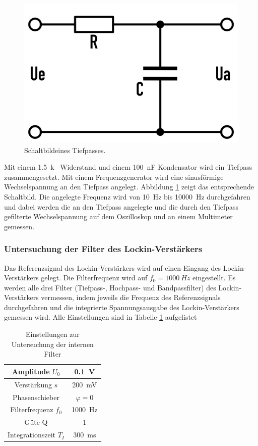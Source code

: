 \documentclass[12pt,a4paper]{article}
\begin{document}
\begin{figure}[H]
\centering
\includegraphics[scale=0.1]{Bilder/Vorversuch1/Tiefpass_Schaltbild.png}
\caption[test]{Schaltbild\footnotemark eines Tiefpasses.}
\label{fig:Tiefpass_Schaltbild}
\end{figure}

Mit einem \SI{1,5}{k \Omega} Widerstand und einem \SI{100}{nF} Kondensator wird ein Tiefpass zusammengesetzt. Mit einem Frequenzgenerator wird eine sinusförmige Wechselspannung an den Tiefpass angelegt. Abbildung \ref{fig:Tiefpass_Schaltbild} zeigt das entsprechende Schaltbild. Die angelegte Frequenz wird von \SI{10}{Hz} bis \SI{10000}{Hz} durchgefahren und dabei werden die an den Tiefpass angelegte und die durch den Tiefpass gefilterte Wechselspannung auf dem Oszilloskop und an einem Multimeter gemessen.

\subsubsection{Untersuchung der Filter des Lockin-Verstärkers}
Das Referenzsignal des Lockin-Verstärkers wird auf einen Eingang des Lockin-Verstärkers gelegt. Die Filterfrequenz wird auf $f_0 = \SI{1000}{Hz}$ eingestellt. Es werden alle drei Filter (Tiefpass-, Hochpass- und Bandpassfilter) des Lockin-Verstärkers vermessen, indem jeweils die Frequenz des Referenzsignals durchgefahren und die integrierte Spannungsausgabe des Lockin-Verstärkers gemessen wird. Alle Einstellungen sind in Tabelle \ref{tab:vor2} aufgelistet

\begin{table}[H]
\centering
\begin{tabular}{|c|c|}
\hline 
Amplitude $U_0$ & \SI{0,1}{V} \\
\hline 
Verstärkung $s$ & \SI{200}{mV} \\ 
\hline 
Phasenschieber & $\varphi = 0$ \\ 
\hline 
Filterfrequenz $f_0$ & \SI{1000}{Hz} \\ 
\hline 
Güte Q & 1 \\ 
\hline
Integrationszeit $T_I$ & \SI{300}{ms} \\ 
\hline 
\end{tabular} 
\caption{Einstellungen zur Untersuchung der internen Filter}
\label{tab:vor2}
\end{table}
\end{document}
